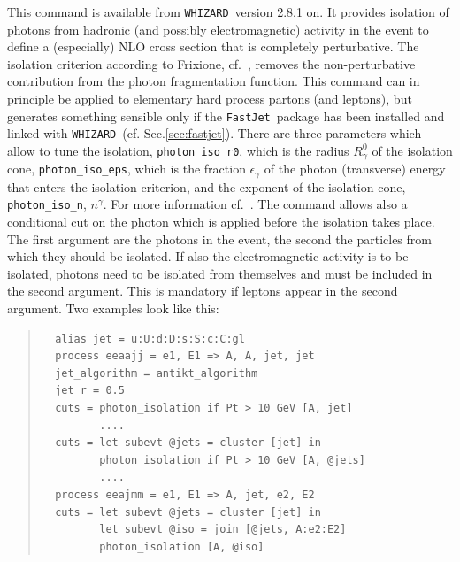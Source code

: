 \documentclass[12pt]{book}
\newcommand{\ttt}[1]{\texttt{#1}}
\newcommand{\whizard}{\ttt{WHIZARD}}
\newcommand{\fastjet}{\ttt{FastJet}}
\begin{document}
This command is available from \whizard\ version 2.8.1 on. It provides
isolation of photons from hadronic (and possibly electromagnetic)
activity in the event to define a (especially) NLO cross section that
is completely perturbative. The isolation criterion according to
Frixione, cf.~\cite{Frixione:1998jh}, removes the non-perturbative
contribution from the photon fragmentation function. This command can
in principle be applied to elementary hard process partons (and
leptons), but generates something sensible only if the
\fastjet\ package has been installed and linked with
\whizard\ (cf. Sec.\ref{sec:fastjet}). There are three parameters
which allow to tune the isolation, \ttt{photon\_iso\_r0}, which is the
radius $R^0_\gamma$ of the isolation cone, \ttt{photon\_iso\_eps},
which is the fraction $\epsilon_\gamma$ of the photon (transverse)
energy that enters the isolation criterion, and the exponent of the
isolation cone, \ttt{photon\_iso\_n}, $n^\gamma$. For more information
cf.~\cite{Frixione:1998jh}. The command allows also a conditional cut
on the photon which is applied before the isolation takes place. The
first argument are the photons in the event, the second the particles
from which they should be isolated. If also the electromagnetic
activity is to be isolated, photons need to be isolated from
themselves and must be included in the second argument. This is
mandatory if leptons appear in the second argument. Two examples look
like this:
\begin{quote}
\begin{footnotesize}
\begin{verbatim}
  alias jet = u:U:d:D:s:S:c:C:gl
  process eeaajj = e1, E1 => A, A, jet, jet
  jet_algorithm = antikt_algorithm
  jet_r = 0.5
  cuts = photon_isolation if Pt > 10 GeV [A, jet]
         ....
  cuts = let subevt @jets = cluster [jet] in
         photon_isolation if Pt > 10 GeV [A, @jets]
         ....
  process eeajmm = e1, E1 => A, jet, e2, E2
  cuts = let subevt @jets = cluster [jet] in
         let subevt @iso = join [@jets, A:e2:E2]
         photon_isolation [A, @iso]
\end{verbatim}
\end{footnotesize}
\end{quote}
\end{document}
